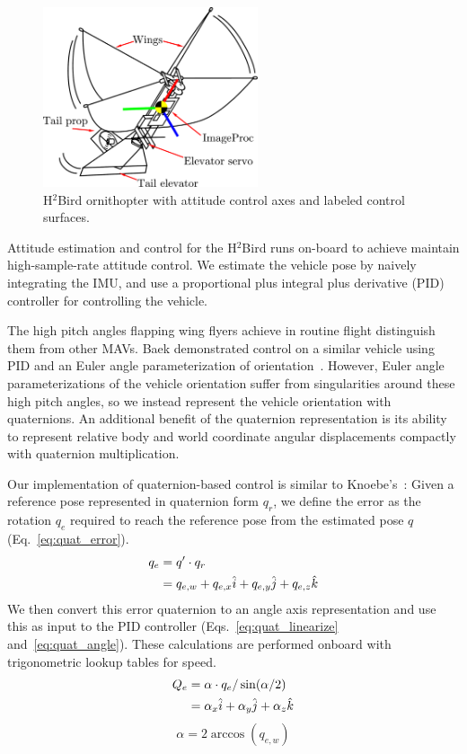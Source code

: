 \documentclass{aamas2013}
\begin{document}
\begin{figure}[!tb]
\centering
\includegraphics[height=150pt]{figures/h2bird_axes.pdf}
\caption{H$^2$Bird ornithopter with attitude control axes and labeled control surfaces.}
\label{fig:h2Bird_axes}
\end{figure}

Attitude estimation and control for the H$^2$Bird runs on-board to achieve 
maintain high-sample-rate attitude control. We estimate the vehicle pose by naively
integrating the IMU, and use a proportional plus integral plus derivative (PID) 
controller for controlling the vehicle.

The high pitch angles flapping wing flyers achieve in routine flight distinguish them 
from other MAVs. Baek demonstrated control on a similar vehicle using PID and an Euler angle
parameterization of orientation~\cite{baek:tracking}. However, Euler angle parameterizations of the vehicle orientation 
suffer from singularities around these high pitch angles, so we instead 
represent the vehicle orientation with quaternions. An additional benefit of 
the quaternion representation is its ability to represent relative body and 
world coordinate angular displacements compactly with quaternion 
multiplication.

Our implementation of quaternion-based control is similar to Knoebe's~\cite{knoebe:quatcontrol}:
Given a reference pose represented in quaternion form $q_r$, we define the error as the rotation $q_e$ 
required to reach the reference pose from the estimated pose $q$ (Eq.~\ref{eq:quat_error}). 
\begin{align}
\label{eq:quat_error}
q_e &= q^{\prime}\cdot q_r \\
		&= q_{e,w} + q_{e,x}\hat{i} + q_{e,y}\hat{j} + q_{e,z}\hat{k} \notag 
\end{align}
We then convert this error quaternion to an angle axis representation and use this 
as input to the PID controller (Eqs.~\ref{eq:quat_linearize} and~\ref{eq:quat_angle}).
These calculations are performed onboard with trigonometric lookup tables for speed.
\begin{align}
\label{eq:quat_linearize}
Q_e &= \alpha\cdot q_e/\sin(\alpha /2) \\
		&= \alpha_{x}\hat{i} + \alpha_{y}\hat{j} + \alpha_{z}\hat{k} \notag
\end{align}
\begin{equation}
\label{eq:quat_angle}
\alpha = 2\arccos(q_{e,w})
\end{equation}
\end{document}
